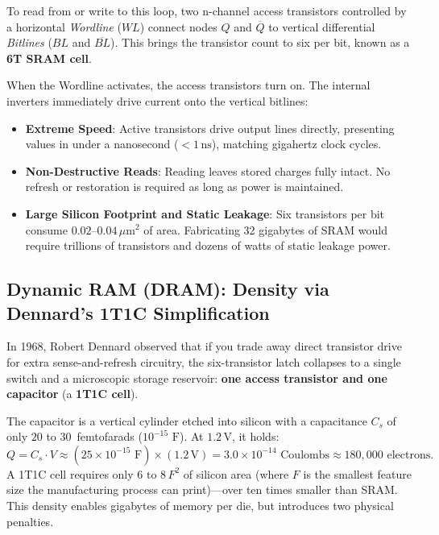 To read from or write to this loop, two n-channel access transistors controlled by a
horizontal \emph{Wordline} ($WL$) connect nodes $Q$ and $\overline{Q}$ to vertical
differential \emph{Bitlines} ($BL$ and $\overline{BL}$). This brings the transistor
count to six per bit, known as a \textbf{6T SRAM cell}.

When the Wordline activates, the access transistors turn on. The internal inverters
immediately drive current onto the vertical bitlines:
\begin{itemize}[itemsep=0pt]
    \item \textbf{Extreme Speed}: Active transistors drive output lines directly, presenting values in under a nanosecond ($< 1\,\text{ns}$), matching gigahertz clock cycles.
    \item \textbf{Non-Destructive Reads}: Reading leaves stored charges fully intact. No refresh or restoration is required as long as power is maintained.
    \item \textbf{Large Silicon Footprint and Static Leakage}: Six transistors per bit consume $0.02\text{--}0.04\,\mu\text{m}^2$ of area. Fabricating 32 gigabytes of SRAM would require trillions of transistors and dozens of watts of static leakage power.
\end{itemize}

\subsection{Dynamic RAM (DRAM): Density via Dennard's 1T1C Simplification}

In 1968, Robert Dennard observed that if you trade away direct transistor drive for
extra sense-and-refresh circuitry, the six-transistor latch collapses to a single switch
and a microscopic storage reservoir: \textbf{one access transistor and one capacitor}
(a \textbf{1T1C cell}).

The capacitor is a vertical cylinder etched into silicon with a capacitance $C_s$ of
only $20$ to $30$~femtofarads ($10^{-15}\text{ F}$). At $1.2\,\text{V}$, it holds:
\[
    Q = C_s \cdot V \approx (25 \times 10^{-15}\text{ F}) \times (1.2\,\text{V}) = 3.0 \times 10^{-14}\text{ Coulombs} \approx 180{,}000\text{ electrons}.
\]
A 1T1C cell requires only $6\text{ to }8\,F^2$ of silicon area (where $F$ is the smallest feature size the manufacturing process can print)---over ten times smaller than
SRAM. This density enables gigabytes of memory per die, but introduces two physical penalties.

